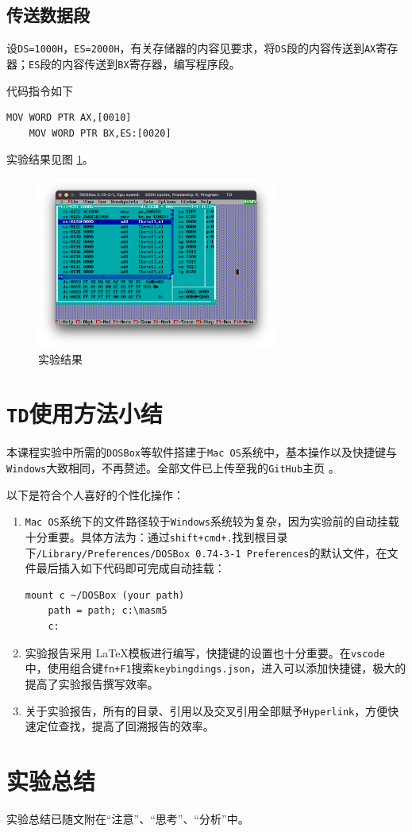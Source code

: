 \documentclass[11pt]{SEU-Digital-Report}
\begin{document}
\subsection{传送数据段}
设\texttt{DS=1000H}，\texttt{ES=2000H}，有关存储器的内容见要求，将\texttt{DS}段的内容传送到\texttt{AX}寄存器；\texttt{ES}段的内容传送到\texttt{BX}寄存器，编写程序段。

代码指令如下
\begin{lstlisting}[language={[x86masm]Assembler},title=code]
    MOV WORD PTR AX,[0010]
    MOV WORD PTR BX,ES:[0020]
\end{lstlisting}

实验结果见图 \ref{fig:rlt7}。
\begin{figure}[htbp]
    \centering
    \includegraphics[width=0.7\textwidth]{fig/rlt7.png}
    \caption{实验结果}
    \label{fig:rlt7}
\end{figure}

\section{\texttt{TD}使用方法小结}
本课程实验中所需的\texttt{DOSBox}等软件搭建于\texttt{Mac OS}系统中，基本操作以及快捷键与\texttt{Windows}大致相同，不再赘述。全部文件已上传至我的\texttt{GitHub}主页 \cite{mygit}。

以下是符合个人喜好的个性化操作：
\begin{enumerate}
    \item \texttt{Mac OS}系统下的文件路径较于\texttt{Windows}系统较为复杂，因为实验前的自动挂载十分重要。具体方法为：通过\texttt{shift+cmd+.}找到根目录下\texttt{/Library/Preferences/DOSBox 0.74-3-1 Preferences}的默认文件，在文件最后插入如下代码即可完成自动挂载：
    \begin{lstlisting}[language={[x86masm]Assembler},title=code]
    mount c ~/DOSBox (your path) 
    path = path; c:\masm5
    c:
    \end{lstlisting}
    \item 实验报告采用 \LaTeX 模板进行编写，快捷键的设置也十分重要。在\texttt{vscode}中，使用组合键\texttt{fn+F1}搜索\texttt{keybingdings.json}，进入可以添加快捷键，极大的提高了实验报告撰写效率。
    \item 关于实验报告，所有的目录、引用以及交叉引用全部赋予\texttt{Hyperlink}，方便快速定位查找，提高了回溯报告的效率。
\end{enumerate}

\section{实验总结}
实验总结已随文附在“注意”、“思考”、“分析”中。

\printbibliography
\end{document}
